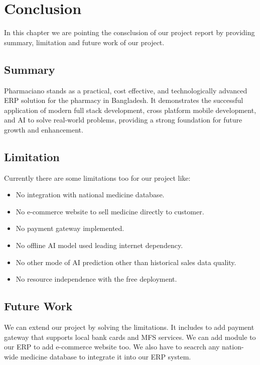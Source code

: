 \chapter{Conclusion}

In this chapter we are pointing the consclusion of our project report by providing summary, limitation and future work of our project.

\section{Summary}
Pharmaciano stands as a practical, cost effective, and technologically advanced ERP solution for the pharmacy in Bangladesh. It demonstrates the successful application of modern full stack development, cross platform mobile development, and AI to solve real-world  problems, providing a strong foundation for future growth and enhancement.

\section{Limitation}
Currently there are some limitations too for our project like:
\begin{itemize}
\item No integration with national medicine database. 
\item No e-commerce website to sell medicine directly to customer.
\item No payment gateway implemented.
\item No offline AI model used leading internet dependency.
\item No other mode of AI prediction other than historical sales data quality.
\item No resource independence with the free deployment.
\end{itemize}
\section{Future Work}
We can extend our project by solving the limitations. It includes to add payment gateway that supports local bank cards and MFS services. We can add module to our ERP to add e-commerce website too. We also have to seacrch any nation-wide medicine database to integrate it into our ERP system.
